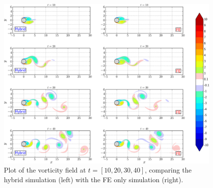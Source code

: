 	\begin{figure}[!p]
	\centering
	\includegraphics[width=\linewidth]{./figures/validation/isc/hybrid_cylinder_LongRun_contourfComparison_compressed-crop.png}
	\caption{Plot of the vorticity field at $t=[10,20,30,40]$, comparing the hybrid simulation (left) with the FE only simulation (right).}
	\label{fig:hybrid_cylinder_LongRun_contourfComparison}
	\end{figure}

